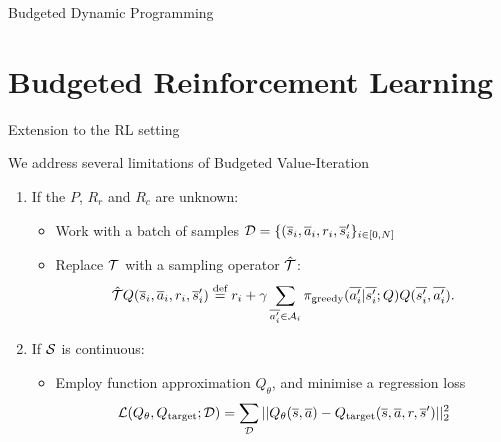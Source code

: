 \documentclass[slideopt,A4,showboxes,svgnames]{beamer}
\begin{document}
\begin{frame}{Budgeted Dynamic Programming}
\begin{center}
\end{center}
\end{frame}

\section{Budgeted Reinforcement Learning}
\frame{\sectionpage}

\begin{frame}{Extension to the RL setting}

We address several limitations of Budgeted Value-Iteration

\begin{enumerate}[<+->]
	\item If the $P$, $R_r$ and $R_c$ are unknown:
	\begin{itemize}[<+->]
		\item Work with a {batch} of samples $\mathcal{D}=\{(\overline{s}_i,\overline{a}_i,r_i,\overline{s}_i'\}_{i\in [0,N]}$
		\item Replace $\mathcal{T}$ with a sampling operator $\hat{\mathcal{T}}$:
		\begin{equation*}
		\hat{\cT} Q(\os_i, \oa_i, r_i, \os'_i) \eqdef r_i + \gamma \sum_{\ov{a'_i}\in \cA_i} \pi_\text{greedy}(\ov{a'_i}|\ov{s'_i}; Q) Q(\ov{s'_i}, \ov{a'_i}).
		\end{equation*}
	\end{itemize}
	\item If $\mathcal{S}$ is continuous:
	\begin{itemize}
		\item Employ function approximation $Q_\theta$, and minimise a regression loss
		$$\mathcal{L}(Q_\theta, Q_\text{target};\mathcal{D}) = \sum_{\mathcal{D}} ||Q_\theta(\overline{s}, \overline{a}) - Q_\text{target}(\overline{s}, \overline{a}, r, \overline{s}')||_2^2$$
	\end{itemize}
	
\end{enumerate}

\end{frame}
\end{document}
